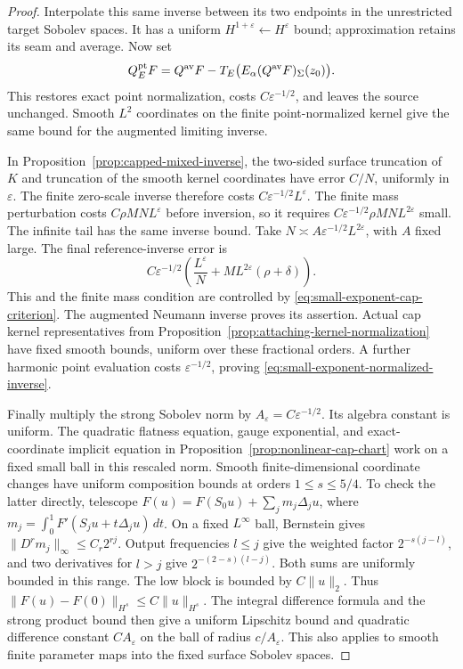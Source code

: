 \documentclass[11pt]{amsart}
\theoremstyle{definition}
\theoremstyle{remark}
\theoremstyle{plain}
\begin{document}
\begin{proof}
Interpolate this same inverse between its two endpoints in
the unrestricted target Sobolev spaces. It has a uniform
$H^{1+\varepsilon}\leftarrow H^\varepsilon$ bound;
approximation retains its seam and average. Now set
\[
 Q_E^{\rm pt}F=Q^{\rm av}F-
 T_E\bigl(E_\alpha(Q^{\rm av}F)_\Sigma(z_0)\bigr).
\]
This restores exact point normalization, costs
$C\varepsilon^{-1/2}$, and leaves the source unchanged.
Smooth $L^2$ coordinates on the finite point-normalized
kernel give the same bound for the augmented limiting inverse.

In Proposition~\ref{prop:capped-mixed-inverse}, the two-sided
surface truncation of $K$ and truncation of the smooth kernel
coordinates have error $C/N$, uniformly in $\varepsilon$.
The finite zero-scale inverse therefore costs
$C\varepsilon^{-1/2}L^\varepsilon$. The finite mass
perturbation costs $C\rho MN L^\varepsilon$ before inversion,
so it requires
$C\varepsilon^{-1/2}\rho MN L^{2\varepsilon}$ small.
The infinite tail has the same inverse bound. Take
$N\asymp A\varepsilon^{-1/2}L^{2\varepsilon}$, with $A$
fixed large. The final reference-inverse error is
\[
 C\varepsilon^{-1/2}\left(
       \frac{L^\varepsilon}{N}
                   +ML^{2\varepsilon}(\rho+\delta)\right).
\]
This and the finite mass condition are controlled by
\eqref{eq:small-exponent-cap-criterion}. The augmented
Neumann inverse proves its assertion. Actual cap kernel
representatives from
Proposition~\ref{prop:attaching-kernel-normalization} have
fixed smooth bounds, uniform over these fractional orders.
A further harmonic point evaluation costs
$\varepsilon^{-1/2}$, proving
\eqref{eq:small-exponent-normalized-inverse}.

Finally multiply the strong Sobolev norm by
$A_\varepsilon=C\varepsilon^{-1/2}$. Its algebra constant
is uniform. The quadratic flatness equation, gauge exponential,
and exact-coordinate implicit equation in
Proposition~\ref{prop:nonlinear-cap-chart} work on a fixed
small ball in this rescaled norm. Smooth finite-dimensional
coordinate changes have uniform composition bounds at orders
$1\leq s\leq5/4$. To check the latter directly, telescope
$F(u)=F(S_0u)+\sum_jm_j\Delta_ju$, where
$m_j=\int_0^1F'(S_ju+t\Delta_ju)\,dt$.
On a fixed $L^\infty$ ball, Bernstein gives
$\|D^rm_j\|_\infty\leq C_r2^{rj}$.
Output frequencies $l\leq j$ give the weighted factor
$2^{-s(j-l)}$, and two derivatives for $l>j$ give
$2^{-(2-s)(l-j)}$. Both sums are uniformly bounded in this
range. The low block is bounded by $C\|u\|_2$.
Thus $\|F(u)-F(0)\|_{H^s}\leq C\|u\|_{H^s}$.
The integral difference formula and the strong product bound
then give a uniform Lipschitz bound and quadratic difference
constant $CA_\varepsilon$ on the ball of radius
$c/A_\varepsilon$. This also applies to smooth finite
parameter maps into the fixed surface Sobolev spaces.


\end{proof}
\end{document}
